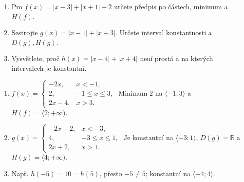 \documentclass[11pt,a4paper]{article}
\begin{document}
\begin{zadaniReseniBox}[title={Domácí úkol}]
\begin{enumerate}[label=\alph*)]
\item Pro $f(x)=|x-3|+|x+1|-2$ určete předpis po částech, minimum a $H(f)$.
\item Sestrojte $g(x)=|x-1|+|x+3|$. Určete interval konstantnosti a $D(g),H(g)$.
\item Vysvětlete, proč $h(x)=|x-4|+|x+4|$ není prostá a na kterých intervalech je konstantní.
\end{enumerate}
\tcblower
\begin{enumerate}[label=\alph*)]
\item $f(x)=\begin{cases}-2x,&x<-1,\\2,&-1\le x\le3,\\2x-4,&x>3.\end{cases}$ Minimum $2$ na $\langle-1;3\rangle$ a $H(f)=\langle2;+\infty)$. 
\item $g(x)=\begin{cases}-2x-2,&x<-3,\\4,&-3\le x\le1,\\2x+2,&x>1.\end{cases}$ Je konstantní na $\langle-3;1\rangle$, $D(g)=\mathbb R$ a $H(g)=\langle4;+\infty)$.
\item Např. $h(-5)=10=h(5)$, přesto $-5\ne5$; konstantní na $\langle-4;4\rangle$.
\end{enumerate}
\end{zadaniReseniBox}
\end{document}
